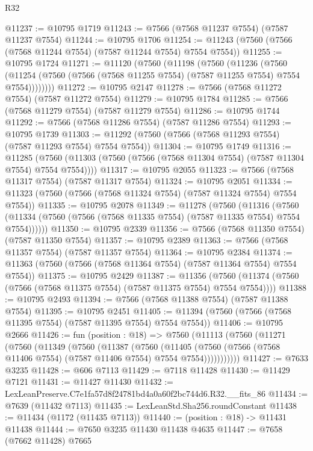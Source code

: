 \begin{lexlean}{R32}
\begin{coremodule}
@11237 := @10795 @1719
@11243 := @7566 (@7568 @11237 @7554) (@7587 @11237 @7554)
@11244 := @10795 @1706
@11254 := @11243 (@7560 (@7566 (@7568 @11244 @7554) (@7587 @11244 @7554) @7554 @7554))
@11255 := @10795 @1724
@11271 := @11120
    (@7560
      (@11198
        (@7560
          (@11236
            (@7560
              (@11254 (@7560 (@7566 (@7568 @11255 @7554) (@7587 @11255 @7554) @7554 @7554))))))))
@11272 := @10795 @2147
@11278 := @7566 (@7568 @11272 @7554) (@7587 @11272 @7554)
@11279 := @10795 @1784
@11285 := @7566 (@7568 @11279 @7554) (@7587 @11279 @7554)
@11286 := @10795 @1744
@11292 := @7566 (@7568 @11286 @7554) (@7587 @11286 @7554)
@11293 := @10795 @1739
@11303 := @11292 (@7560 (@7566 (@7568 @11293 @7554) (@7587 @11293 @7554) @7554 @7554))
@11304 := @10795 @1749
@11316 := @11285
    (@7560 (@11303 (@7560 (@7566 (@7568 @11304 @7554) (@7587 @11304 @7554) @7554 @7554))))
@11317 := @10795 @2055
@11323 := @7566 (@7568 @11317 @7554) (@7587 @11317 @7554)
@11324 := @10795 @2051
@11334 := @11323 (@7560 (@7566 (@7568 @11324 @7554) (@7587 @11324 @7554) @7554 @7554))
@11335 := @10795 @2078
@11349 := @11278
    (@7560
      (@11316
        (@7560 (@11334 (@7560 (@7566 (@7568 @11335 @7554) (@7587 @11335 @7554) @7554 @7554))))))
@11350 := @10795 @2339
@11356 := @7566 (@7568 @11350 @7554) (@7587 @11350 @7554)
@11357 := @10795 @2389
@11363 := @7566 (@7568 @11357 @7554) (@7587 @11357 @7554)
@11364 := @10795 @2384
@11374 := @11363 (@7560 (@7566 (@7568 @11364 @7554) (@7587 @11364 @7554) @7554 @7554))
@11375 := @10795 @2429
@11387 := @11356
    (@7560 (@11374 (@7560 (@7566 (@7568 @11375 @7554) (@7587 @11375 @7554) @7554 @7554))))
@11388 := @10795 @2493
@11394 := @7566 (@7568 @11388 @7554) (@7587 @11388 @7554)
@11395 := @10795 @2451
@11405 := @11394 (@7560 (@7566 (@7568 @11395 @7554) (@7587 @11395 @7554) @7554 @7554))
@11406 := @10795 @2666
@11426 := fun (position : @18) =>
  @7560
    (@11113
      (@7560
        (@11271
          (@7560
            (@11349
              (@7560
                (@11387
                  (@7560
                    (@11405
                      (@7560 (@7566 (@7568 @11406 @7554) (@7587 @11406 @7554) @7554 @7554)))))))))))
@11427 := @7633 @3235
@11428 := @606 @7113
@11429 := @7118 @11428
@11430 := @11429 @7121
@11431 := @11427 @11430
@11432 := LexLeanPreserve.C7e1fa57d8f24781bd4a0a60f2bc744d6.R32.__fits_86
@11434 := @7639 (@11432 @7113)
@11435 := LexLeanStd.Sha256.roundConstant
@11438 := @11434 (@1172 (@11435 @7113))
@11440 := (position : @18) -> @11431 @11438
@11444 := @7650 @3235 @11430 @11438 @4635
@11447 := @7658 (@7662 @11428) @7665

\end{coremodule}
\end{lexlean}
